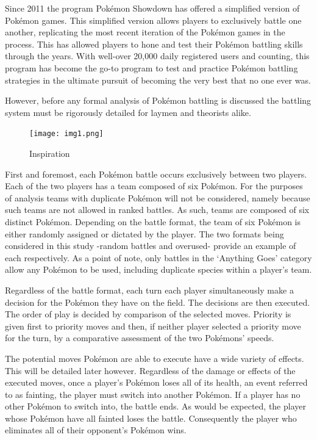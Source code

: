 \documentclass[12pt,twoside]{reedthesis}
\begin{document}
  Since 2011 the program Pokémon Showdown has offered a simplified version
  of Pokémon games. This simplified version allows players to exclusively
  battle one another, replicating the most recent iteration of the Pokémon
  games in the process. This has allowed players to hone and test their
  Pokémon battling skills through the years. With well-over 20,000 daily
  registered users and counting, this program has become the go-to program
  to test and practice Pokémon battling strategies in the ultimate pursuit
  of becoming the very best that no one ever was.
  
  However, before any formal analysis of Pokémon battling is discussed the
  battling system must be rigorously detailed for laymen and theorists
  alike.
  
  \begin{figure}[htbp]
  \centering
  \texttt{[image: img1.png]}
  \caption{Inspiration}
  \end{figure}
  
  First and foremost, each Pokémon battle occurs exclusively between two
  players. Each of the two players has a team composed of six Pokémon. For
  the purposes of analysis teams with duplicate Pokémon will not be
  considered, namely because such teams are not allowed in ranked battles.
  As such, teams are composed of six distinct Pokémon. Depending on the
  battle format, the team of six Pokémon is either randomly assigned or
  dictated by the player. The two formats being considered in this study
  -random battles and overused- provide an example of each respectively.
  As a point of note, only battles in the `Anything Goes' category allow
  any Pokémon to be used, including duplicate species within a player's
  team.
  
  Regardless of the battle format, each turn each player simultaneously
  make a decision for the Pokémon they have on the field. The decisions
  are then executed. The order of play is decided by comparison of the
  selected moves. Priority is given first to priority moves and then, if
  neither player selected a priority move for the turn, by a comparative
  assessment of the two Pokémons' speeds.
  
  The potential moves Pokémon are able to execute have a wide variety of
  effects. This will be detailed later however. Regardless of the damage
  or effects of the executed moves, once a player's Pokémon loses all of
  its health, an event referred to as fainting, the player must switch
  into another Pokémon. If a player has no other Pokémon to switch into,
  the battle ends. As would be expected, the player whose Pokémon have all
  fainted loses the battle. Consequently the player who eliminates all of
  their opponent's Pokémon wins.
  
\end{document}
